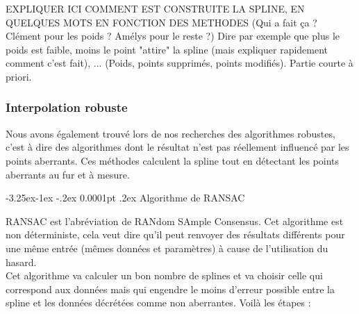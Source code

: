 \documentclass[a4paper,12pt]{article} %
\makeatletter
\renewcommand\paragraph{\@startsection{paragraph}{4}{\z@}%
                                      {-3.25ex\@plus -1ex \@minus -.2ex}%
                                      {0.0001pt \@plus .2ex}%
                                      {\normalfont\normalsize\bfseries}}
\makeatother
\begin{document}
			        EXPLIQUER ICI COMMENT EST CONSTRUITE LA SPLINE, EN QUELQUES MOTS EN FONCTION DES METHODES (Qui a fait ça ? Clément pour les poids ? Amélys pour le reste ?) Dire par exemple que plus le poids est faible, moins le point "attire" la spline (mais expliquer rapidement comment c'est fait), ... (Poids, points supprimés, points modifiés). Partie courte à priori.
					    
			\subsubsection{Interpolation robuste}
        		
        		Nous avons également trouvé lors de nos recherches des algorithmes robustes, c'est à dire des algorithmes dont le résultat n'est pas réellement influencé par les points aberrants. Ces méthodes calculent la spline tout en détectant les points aberrants au fur et à mesure.
        		
			    \paragraph{Algorithme de RANSAC}
    			   
                    RANSAC est l'abréviation de RANdom SAmple Consensus. Cet algorithme est non déterministe, cela veut dire qu'il peut renvoyer des résultats différents pour une même entrée (mêmes données et paramètres) à cause de l'utilisation du hasard.\\
                    Cet algorithme va calculer un bon nombre de splines et va choisir celle qui correspond aux données mais qui engendre le moins d'erreur possible entre la spline et les données décrétées comme non aberrantes. Voilà les étapes :\\
                    
\end{document}
